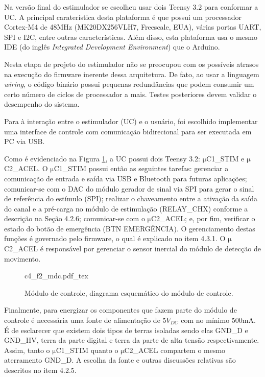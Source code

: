 Na versão final do estimulador se escolheu usar dois Teensy 3.2 para conformar a \acrshort{UC}. A principal caraterística desta plataforma é que possui um processador Cortex-M4 de 48MHz (MK20DX256VLH7, Freescale, EUA), várias portas \acrshort{UART}, \acrshort{SPI} e \acrshort{I2C}, entre outras características. Além disso, esta plataforma usa o mesmo \acrshort{IDE} (do inglês \textit{Integrated Development Environment}) que o Arduino.

Nesta etapa de projeto do estimulador não se preocupou com os possíveis atrasos na execução do firmware inerente dessa arquitetura. De fato, ao usar a linguagem \textit{wiring}, o código binário possui pequenas redundâncias que podem consumir um certo número de ciclos de processador a mais. Testes posteriores devem validar o desempenho do sistema.

Para à interação entre o estimulador (\acrshort{UC}) e o usuário, foi escolhido implementar uma interface de controle com comunicação bidirecional para ser executada em \acrshort{PC} via \acrshort{USB}.

Como é evidenciado na Figura \ref{fig:c4_f2_mdc}, a \acrshort{UC} possui dois Teensy 3.2: $\mathrm{\mu}$C1\_STIM e $\mathrm{\mu}$C2\_ACEL. O $\mathrm{\mu}$C1\_STIM possui então as seguintes tarefas: gerenciar a comunicação de entrada e saída via \acrshort{USB} e Bluetooth para futuras aplicações; comunicar-se com o \acrshort{DAC} do módulo gerador de sinal via \acrshort{SPI} para gerar o sinal de referência do estímulo (\acrshort{SPI}); realizar o chaveamento entre a ativação da saída do canal e a pré-carga no módulo de estimulação (RELAY\_CHX) conforme a descrição na Seção 4.2.6; comunicar-se com o $\mathrm{\mu}$C2\_ACEL; e, por fim, verificar o estado do botão de emergência (BTN EMERGÊNCIA). O gerenciamento destas funções é governado pelo firmware, o qual é explicado no item 4.3.1. O $\mathrm{\mu}$C2\_ACEL é responsável por gerenciar o sensor inercial do módulo de detecção de movimento.

\begin{figure}[h]
    \centering %
    \scriptsize %
    \def\svgwidth{0.61\columnwidth}%
    {c4_f2_mdc.pdf_tex}
    \caption{Módulo de controle, diagrama esquemático do módulo de controle.}
    \label{fig:c4_f2_mdc}
\end{figure}

Finalmente, para energizar os componentes que fazem parte do módulo de controle é necessária uma fonte de alimentação de 5$V_{DC}$ com no mínimo 500mA. É de esclarecer que existem dois tipos de terras isoladas sendo elas GND\_D e GND\_HV, terra da parte digital e terra da parte de alta tensão respectivamente. Assim, tanto o $\mathrm{\mu}$C1\_STIM quanto o $\mathrm{\mu}$C2\_ACEL compartem o mesmo aterramento GND\_D. A escolha da fonte e outras discussões relativas são descritos no item 4.2.5. 

